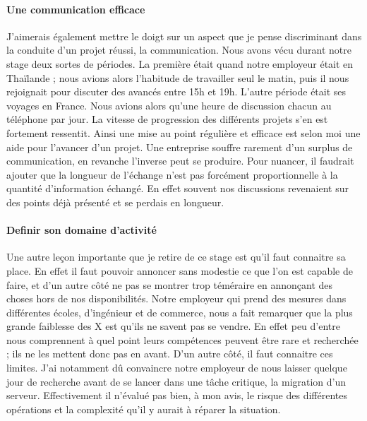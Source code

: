 \paragraph{Une communication efficace}
J'aimerais également mettre le doigt sur un aspect que je pense discriminant dans la conduite d'un projet réussi, la communication. Nous avons vécu durant notre stage deux sortes de périodes. La première était quand notre employeur était en Thaïlande ; nous avions alors l'habitude de travailler seul le matin, puis il nous rejoignait pour discuter des avancés entre 15h et 19h. L'autre période était ses voyages en France. Nous avions alors qu'une heure de discussion chacun au téléphone par jour. La vitesse de progression des différents projets s'en est fortement ressentit. Ainsi une mise au point régulière et efficace est selon moi une aide pour l’avancer d'un projet. Une entreprise souffre rarement d'un surplus de communication, en revanche l'inverse peut se produire. Pour nuancer, il faudrait ajouter que la longueur de l'échange n'est pas forcément proportionnelle à la quantité d'information échangé. En effet souvent nos discussions revenaient sur des points déjà présenté et se perdais en longueur.

\paragraph{Definir son domaine d'activité}
Une autre leçon importante que je retire de ce stage est qu'il faut connaitre sa place. En effet il faut pouvoir annoncer sans modestie ce que l'on est capable de faire, et d'un autre côté ne pas se montrer trop téméraire en annonçant des choses hors de nos disponibilités. Notre employeur qui prend des mesures dans différentes écoles, d'ingénieur et de commerce, nous a fait remarquer que la plus grande faiblesse des X est qu'ils ne savent pas se vendre. En effet peu d'entre nous comprennent à quel point leurs compétences peuvent être rare et recherchée ; ils ne les mettent donc pas en avant. D'un autre côté, il faut connaitre ces limites. J'ai notamment dû convaincre notre employeur de nous laisser quelque jour de recherche avant de se lancer dans une tâche critique, la migration d'un serveur. Effectivement il n'évalué pas bien, à mon avis, le risque des différentes opérations et la complexité qu'il y aurait à réparer la situation.

